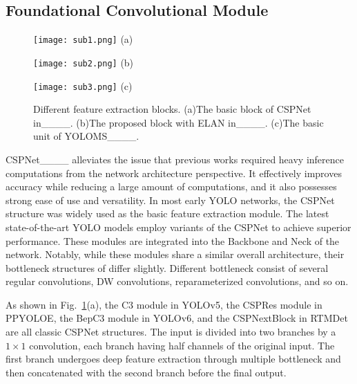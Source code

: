 \subsection{Foundational Convolutional Module}
\begin{figure}[htbp]  
    \centering  
    \begin{minipage}[b]{0.3\textwidth}  
        \centering  
        \texttt{[image: sub1.png]}  
        \footnotesize{(a) 
}  
    \end{minipage}  
    \hfill  
    \begin{minipage}[b]{0.29\textwidth}  
        \centering  
        \texttt{[image: sub2.png]}  
        \footnotesize{(b) 
}  
    \end{minipage}  
    \hfill  
    \begin{minipage}[b]{0.33\textwidth}  
        \centering  
        \texttt{[image: sub3.png]}  
        \footnotesize{(c) \\
         }  
    \end{minipage}  
    \caption{Different feature extraction blocks. (a)The basic block of CSPNet in____. (b)The proposed block with ELAN in____. (c)The basic unit of YOLOMS____.}  
    \label{fig3}  
\end{figure}
CSPNet____ alleviates the issue that previous works required heavy inference computations from the network architecture perspective. It effectively improves accuracy while reducing a large amount of computations, and it also possesses strong ease of use and versatility. In most early YOLO networks, the CSPNet structure was widely used as the basic feature extraction module. The latest state-of-the-art YOLO models employ variants of the CSPNet to achieve superior performance. These modules are integrated into the Backbone and Neck of the network. Notably, while these modules share a similar overall architecture, their bottleneck structures of differ slightly. Different bottleneck consist of several regular convolutions, DW convolutions, reparameterized convolutions, and so on.

As shown in Fig.~\ref{fig3}(a), the C3 module in YOLOv5, the CSPRes module in PPYOLOE, the BepC3 module in YOLOv6, and the CSPNextBlock in RTMDet are all classic CSPNet structures. The input is divided into two branches by a $1 \times 1$ convolution, each branch having half channels of the original input. The first branch undergoes deep feature extraction through multiple bottleneck and then concatenated with the second branch before the final output.

